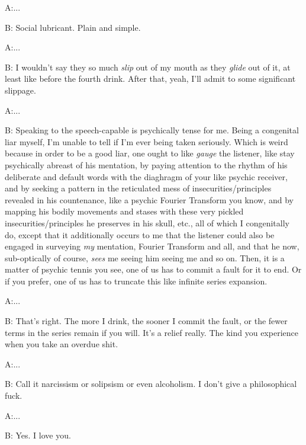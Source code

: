 \documentclass{article}
\begin{document}
\newline

A:...

B: Social lubricant. Plain and simple.
\newline
\newline

A:...

B: I wouldn't say they so much \textit{slip} out of my mouth as they
\textit{glide} out of it, at least like before the fourth drink. After
that, yeah, I'll admit to some significant slippage. \newline
\newline
\newline

A:...

B: Speaking to the speech-capable is psychically tense for me. Being
a congenital liar myself, I'm unable to tell if I'm ever being taken
seriously. Which is weird because in order to be a good liar, one ought
to like \textit{gauge} the listener, like stay psychically abreast of
his mentation, by paying attention to the rhythm of his deliberate and
default words with the diaghragm of your like psychic receiver, and by
seeking a pattern in the reticulated mess of insecurities/principles
revealed in his countenance, like a psychic Fourier Transform you know,
and by mapping his bodily movements and stases with these very pickled
insecurities/principles he preserves in his skull, etc., all of which
I congenitally do, except that it additionally occurs to me that the
listener could also be engaged in surveying \textit{my} mentation,
Fourier Transform and all, and that he now, sub-optically of course,
\textit{sees} me seeing him seeing me and so on. Then, it is a matter of
psychic tennis you see, one of us has to commit a fault for it to end.
Or if you prefer, one of us has to truncate this like infinite series
expansion. \newline \newline

A:...

B: That's right. The more I drink, the sooner I commit the fault, or the
fewer terms in the series remain if you will. It's a relief really. The
kind you experience when you take an overdue shit. \newline \newline

A:...

B: Call it narcissism or solipsism or even alcoholism. I don't give
a philosophical fuck.
\newline
\newline

A:...

B: Yes. I love you.
\newline
\newline
\end{document}
